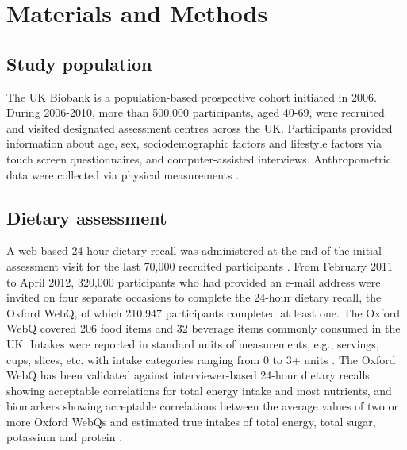 \documentclass[nutrients,article,submit,moreauthors,pdftex]{Definitions/mdpi}
\begin{document}
\hypertarget{sec2}{%
\section{Materials and Methods}\label{sec2}}

\hypertarget{subsec1}{%
\subsection{Study population}\label{subsec1}}

The UK Biobank is a population-based prospective cohort initiated in
2006. \citep{sudlow2015} During 2006-2010, more than 500,000 participants,
aged 40-69, were recruited and visited designated assessment centres
across the UK. Participants provided information about age, sex,
sociodemographic factors and lifestyle factors via touch screen
questionnaires, and computer-assisted interviews. Anthropometric data
were collected via physical measurements \citep{RN113}.

\hypertarget{subsec2}{%
\subsection{Dietary assessment}\label{subsec2}}

A web-based 24-hour dietary recall was administered at the end of the
initial assessment visit for the last 70,000 recruited participants
\citep{RN115}. From February 2011 to April 2012, 320,000 participants who had
provided an e-mail address were invited on four separate occasions to
complete the 24-hour dietary recall, the Oxford WebQ, of which 210,947
participants completed at least one. The Oxford WebQ covered 206 food
items and 32 beverage items commonly consumed in the UK. Intakes were
reported in standard units of measurements, e.g., servings, cups,
slices, etc. with intake categories ranging from 0 to 3+ units
\citep{piernas2021}. The Oxford WebQ has been validated against
interviewer-based 24-hour dietary recalls showing acceptable
correlations for total energy intake and most nutrients, and biomarkers
showing acceptable correlations between the average values of two or
more Oxford WebQs and estimated true intakes of total energy, total
sugar, potassium and protein \citep{Liu2011, Greenwood2019}.
\end{document}
